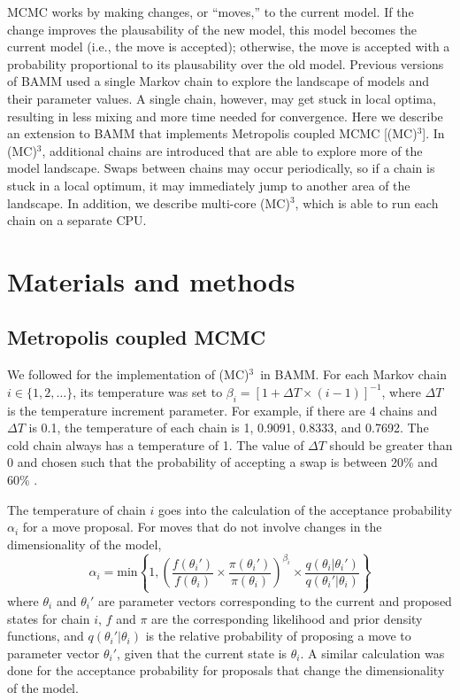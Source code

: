 \documentclass[12pt]{article}
\newcommand{\MCMCMC}{(MC)$^{3}$}
\begin{document}
MCMC works by making changes, or ``moves,'' to the current model.
%
If the change improves the plausability of the new model,
this model becomes the current model (i.e., the move is accepted);
otherwise, the move is accepted with a probability
proportional to its plausability over the old model.
%
Previous versions of BAMM used a single Markov chain
to explore the landscape of models and their parameter values.
%
A single chain, however, may get stuck in local optima,
resulting in less mixing and more time needed for convergence.
%
Here we describe an extension to BAMM
that implements Metropolis coupled MCMC [\MCMCMC].
%
In \MCMCMC, additional chains are introduced
that are able to explore more of the model landscape.
%
Swaps between chains may occur periodically,
so if a chain is stuck in a local optimum,
it may immediately jump to another area of the landscape.
%
In addition, we describe multi-core \MCMCMC,
which is able to run each chain on a separate CPU.


\section*{Materials and methods}

\subsection*{Metropolis coupled MCMC}

We followed \citet{alt04} for the implementation of \MCMCMC\ in BAMM.
%
For each Markov chain $i \in \{1, 2, \dots\}$, its temperature was set to
$\beta_i = [1 + \Delta T \times (i - 1)]^{-1}$,
where $\Delta T$ is the temperature increment parameter.
%
For example, if there are 4 chains and $\Delta T$ is 0.1,
the temperature of each chain is 1, 0.9091, 0.8333, and 0.7692.
%
The cold chain always has a temperature of 1.
%
The value of $\Delta T$ should be greater than 0
and chosen such that the probability of accepting a swap
is between 20\% and 60\% \citep{alt04}.


The temperature of chain $i$ goes into the calculation
of the acceptance probability $\alpha_i$ for a move proposal.
%
For moves that do not involve changes in the dimensionality of the model,
\[\alpha_i = \text{min}\left\{ 1,
    \left(
    \frac{f(\theta_i')}{f(\theta_i)} \times
    \frac{\pi(\theta_i')}{\pi(\theta_i)}
    \right)^{\beta_i} \times
    \frac{q(\theta_i | \theta_i')}{q(\theta_i' | \theta_i)}
\right\}\]
where $\theta_i$ and $\theta_i'$ are parameter vectors
corresponding to the current and proposed states for chain $i$,
$f$ and $\pi$ are the corresponding likelihood and prior density functions,
and $q(\theta_i' | \theta_i)$ is the relative probability
of proposing a move to parameter vector $\theta_i'$,
given that the current state is $\theta_i$.
%
A similar calculation was done for the acceptance probability for proposals
that change the dimensionality of the model.
\end{document}
